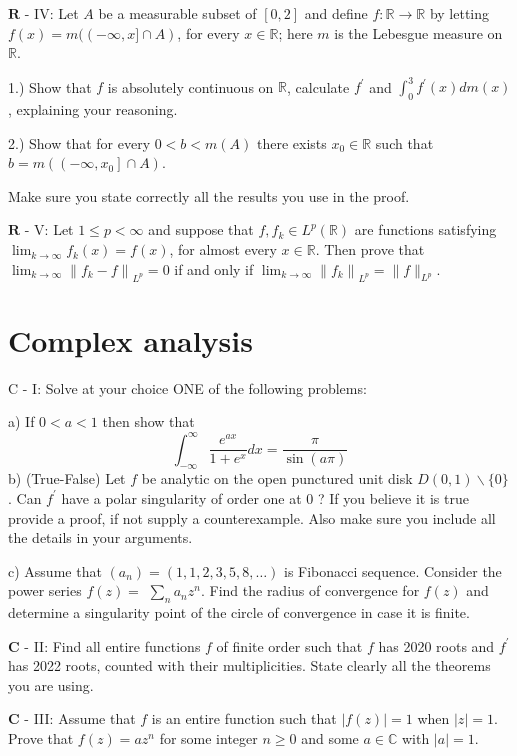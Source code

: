 \documentclass[10pt]{article}
\begin{document}
$\mathbf{R}$ - IV: Let $A$ be a measurable subset of $[0,2]$ and define $f: \mathbb{R} \rightarrow \mathbb{R}$ by letting $f(x)=m((-\infty, x] \cap A)$, for every $x \in \mathbb{R}$; here $m$ is the Lebesgue measure on $\mathbb{R}$.

1.) Show that $f$ is absolutely continuous on $\mathbb{R}$, calculate $f^{\prime}$ and $\int_{0}^{3} f^{\prime}(x) d m(x)$, explaining your reasoning.

2.) Show that for every $0<b<m(A)$ there exists $x_{0} \in \mathbb{R}$ such that $b=m\left(\left(-\infty, x_{0}\right] \cap A\right)$.

Make sure you state correctly all the results you use in the proof.

$\mathbf{R}$ - V: Let $1 \leq p<\infty$ and suppose that $f, f_{k} \in L^{p}(\mathbb{R})$ are functions satisfying $\lim _{k \rightarrow \infty} f_{k}(x)=f(x)$, for almost every $x \in \mathbb{R}$. Then prove that $\lim _{k \rightarrow \infty}\left\|f_{k}-f\right\|_{L^{p}}=0$ if and only if $\lim _{k \rightarrow \infty}\left\|f_{k}\right\|_{L^{p}}=\|f\|_{L^{p}}$.

\section{Complex analysis}
C - I: Solve at your choice ONE of the following problems:

a) If $0<a<1$ then show that
$$
\int_{-\infty}^{\infty} \frac{e^{a x}}{1+e^{x}} d x=\frac{\pi}{\sin (a \pi)}
$$
b) (True-False) Let $f$ be analytic on the open punctured unit disk $D(0,1) \backslash\{0\}$. Can $f^{\prime}$ have a polar singularity of order one at 0 ? If you believe it is true provide a proof, if not supply a counterexample. Also make sure you include all the details in your arguments.

c) Assume that $\left(a_{n}\right)=(1,1,2,3,5,8, \ldots)$ is Fibonacci sequence. Consider the power series $f(z)=$ $\sum_{n} a_{n} z^{n}$. Find the radius of convergence for $f(z)$ and determine a singularity point of the circle of convergence in case it is finite.

$\mathbf{C}$ - II: Find all entire functions $f$ of finite order such that $f$ has 2020 roots and $f^{\prime}$ has 2022 roots, counted with their multiplicities. State clearly all the theorems you are using.

$\mathbf{C}$ - III: Assume that $f$ is an entire function such that $|f(z)|=1$ when $|z|=1$. Prove that $f(z)=a z^{n}$ for some integer $n \geq 0$ and some $a \in \mathbb{C}$ with $|a|=1$.
\end{document}
